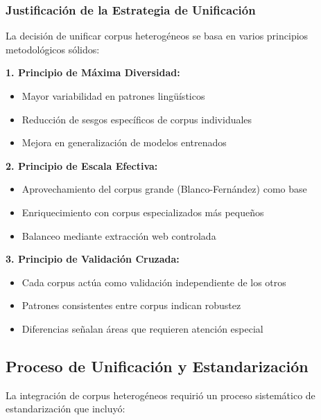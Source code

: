 \subsubsection{Justificación de la Estrategia de Unificación}

La decisión de unificar corpus heterogéneos se basa en varios principios metodológicos sólidos:

\textbf{1. Principio de Máxima Diversidad:}
\begin{itemize}
    \item Mayor variabilidad en patrones lingüísticos
    \item Reducción de sesgos específicos de corpus individuales
    \item Mejora en generalización de modelos entrenados
\end{itemize}

\textbf{2. Principio de Escala Efectiva:}
\begin{itemize}
    \item Aprovechamiento del corpus grande (Blanco-Fernández) como base
    \item Enriquecimiento con corpus especializados más pequeños
    \item Balanceo mediante extracción web controlada
\end{itemize}

\textbf{3. Principio de Validación Cruzada:}
\begin{itemize}
    \item Cada corpus actúa como validación independiente de los otros
    \item Patrones consistentes entre corpus indican robustez
    \item Diferencias señalan áreas que requieren atención especial
\end{itemize}

\subsection{Proceso de Unificación y Estandarización}

La integración de corpus heterogéneos requirió un proceso sistemático de estandarización que incluyó:

